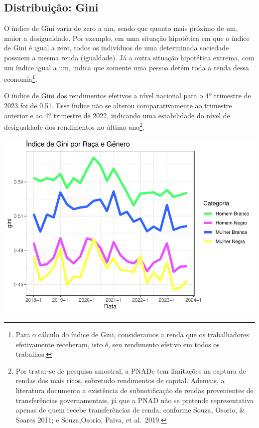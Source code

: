 \documentclass[
]{article}
\begin{document}
\hypertarget{distribuiuxe7uxe3o-gini}{%
\subsection{Distribuição: Gini}\label{distribuiuxe7uxe3o-gini}}

O índice de Gini varia de zero a um, sendo que quanto mais próximo de
um, maior a desigualdade. Por exemplo, em uma situação hipotética em que
o índice de Gini é igual a zero, todos os indivíduos de uma determinada
sociedade possuem a mesma renda (igualdade). Já a outra situação
hipotética extrema, com um índice igual a um, indica que somente uma
pessoa detém toda a renda dessa economia\footnote{Para o cálculo do
  índice de Gini, consideramos a renda que os trabalhadores efetivamente
  receberam, isto é, seu rendimento efetivo em todos os trabalhos.}.

O índice de Gini dos rendimentos efetivos a nível nacional para o 4º
trimestre de 2023 foi de 0.51. Esse índice não se alterou
comparativamente ao trimestre anterior e ao 4º trimestre de 2022,
indicando uma estabilidade do nível de desigualdade dos rendimentos no
último ano\footnote{Por tratar-se de pesquisa amostral, a PNADc tem
  limitações na captura de rendas dos mais ricos, sobretudo rendimentos
  de capital. Ademais, a literatura documenta a existência de
  subnotificação de rendas provenientes de transferências
  governamentais, já que a PNAD não se pretende representativa apenas de
  quem recebe transferências de renda, conforme Souza, Osorio, \& Soares
  2011; e Souza,Osorio, Paiva, et al.~2019.}.

\includegraphics{R-Markdown--Long-Version-_files/figure-latex/unnamed-chunk-25-1.pdf}
\end{document}
